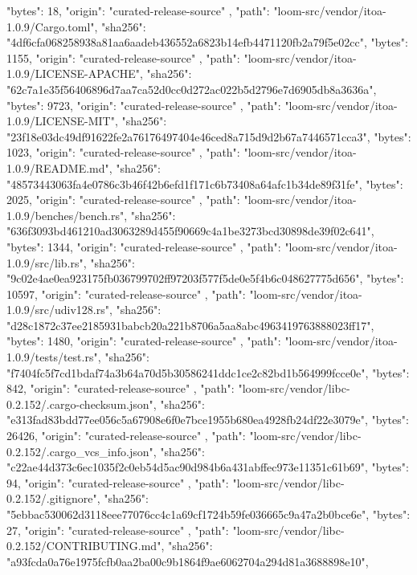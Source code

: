 {{      "bytes": 18,
      "origin": "curated-release-source"
    },
    {
      "path": "loom-src/vendor/itoa-1.0.9/Cargo.toml",
      "sha256": "4df6cfa068258938a81aa6aadeb436552a6823b14efb4471120fb2a79f5e02cc",
      "bytes": 1155,
      "origin": "curated-release-source"
    },
    {
      "path": "loom-src/vendor/itoa-1.0.9/LICENSE-APACHE",
      "sha256": "62c7a1e35f56406896d7aa7ca52d0cc0d272ac022b5d2796e7d6905db8a3636a",
      "bytes": 9723,
      "origin": "curated-release-source"
    },
    {
      "path": "loom-src/vendor/itoa-1.0.9/LICENSE-MIT",
      "sha256": "23f18e03dc49df91622fe2a76176497404e46ced8a715d9d2b67a7446571cca3",
      "bytes": 1023,
      "origin": "curated-release-source"
    },
    {
      "path": "loom-src/vendor/itoa-1.0.9/README.md",
      "sha256": "48573443063fa4e0786c3b46f42b6efd1f171c6b73408a64afc1b34de89f31fe",
      "bytes": 2025,
      "origin": "curated-release-source"
    },
    {
      "path": "loom-src/vendor/itoa-1.0.9/benches/bench.rs",
      "sha256": "636f3093bd461210ad3063289d455f90669c4a1be3273bcd30898de39f02c641",
      "bytes": 1344,
      "origin": "curated-release-source"
    },
    {
      "path": "loom-src/vendor/itoa-1.0.9/src/lib.rs",
      "sha256": "9c02e4ae0ea923175fb036799702ff97203f577f5de0e5f4b6c048627775d656",
      "bytes": 10597,
      "origin": "curated-release-source"
    },
    {
      "path": "loom-src/vendor/itoa-1.0.9/src/udiv128.rs",
      "sha256": "d28c1872c37ee2185931babcb20a221b8706a5aa8abc4963419763888023ff17",
      "bytes": 1480,
      "origin": "curated-release-source"
    },
    {
      "path": "loom-src/vendor/itoa-1.0.9/tests/test.rs",
      "sha256": "f7404fc5f7cd1bdaf74a3b64a70d5b30586241ddc1ce2c82bd1b564999fcce0e",
      "bytes": 842,
      "origin": "curated-release-source"
    },
    {
      "path": "loom-src/vendor/libc-0.2.152/.cargo-checksum.json",
      "sha256": "e313fad83bdd77ee056c5a67908e6f0e7bce1955b680ea4928fb24df22e3079e",
      "bytes": 26426,
      "origin": "curated-release-source"
    },
    {
      "path": "loom-src/vendor/libc-0.2.152/.cargo_vcs_info.json",
      "sha256": "c22ae44d373c6ec1035f2c0eb54d5ac90d984b6a431abffec973e11351c61b69",
      "bytes": 94,
      "origin": "curated-release-source"
    },
    {
      "path": "loom-src/vendor/libc-0.2.152/.gitignore",
      "sha256": "5ebbac530062d3118eee77076cc4c1a69cf1724b59fe036665c9a47a2b0bce6e",
      "bytes": 27,
      "origin": "curated-release-source"
    },
    {
      "path": "loom-src/vendor/libc-0.2.152/CONTRIBUTING.md",
      "sha256": "a93fcda0a76e1975fcfb0aa2ba00c9b1864f9ae6062704a294d81a3688898e10",
}}
